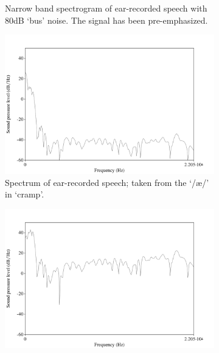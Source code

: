 \begin{figure}[h!]
\begin{subfigure}{0.475\textwidth}
  \caption{Narrow band spectrogram of ear-recorded speech with 80dB `bus' noise.  The signal has been pre-emphasized.}
  \label{spctgrmNarrowEarNoisePremp_35}
\end{subfigure}
\begin{subfigure}{0.475\textwidth}
  \centering
  \includegraphics[width=1\linewidth]{figure/spctrmEar20k.png}
  \caption{Spectrum of ear-recorded speech; taken from the `/\ae/' in `cramp'.}
  \label{spctrmEar20kHz}
\end{subfigure}%
\hfill
\begin{subfigure}{0.475\textwidth}
  \centering
  \includegraphics[width=1\linewidth]{figure/spctrmEar20k_preemp.png}

\end{subfigure}
\end{figure}
